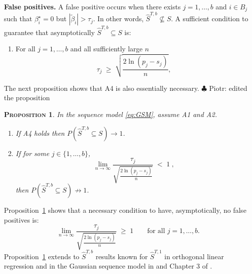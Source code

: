 \documentclass[aos]{imsart}
\theoremstyle{plain}
\newtheorem{prop}{\textsc{Proposition}}[section]
\newcommand{\piotr}[1]{{\small{\color{red} \sf $\clubsuit$ Piotr: #1}}}
\begin{document}
\noindent\textbf{False positives.} 
A false positive %
occurs when there exists $j=1,\ldots,b$ and $i\in B_j$ such that $\beta^\star_i=0$ %
but $|\tilde \beta_i|>\tau_j$. In other words, $\hat S^{T,b}\not\subseteq S$. A sufficient condition to guarantee that asymptotically $\hat S^{T,b}\subseteq S$ is:
\begin{enumerate}[start=4,label={(A\arabic*)}]
    \item For all $j=1,\ldots,b$ and all sufficiently large $n$
\begin{equation*}\label{cond:suffIallblockthresh} 
\tau_j \;\geq\;  \sqrt{\frac{{2\ln(p_j-s_j)}}{{n}}},	
\end{equation*}
\end{enumerate}
The next proposition shows that %
A4 is also essentially necessary.
\piotr{edited the proposition}
\begin{prop}\label{prop:suffnecIblockthresh}In the %
sequence model \eqref{eq:GSM}, assume A1 and A2.
\begin{enumerate}
    \item [a)] If A4 holds then %
$P(\hat{S}^{T,b}\subseteq S) \to 1$.
\item [b)] If for some $j\in\{1,\ldots,b\}$,
\begin{equation}\label{cond:necIallblockthresh0}
\lim_{n\to \infty} \frac{\tau_j}{\sqrt{\frac{{2\ln(p_j-s_j)}}{{n}}}} \;<\;1\; ,	\end{equation}
then  $P(\hat{S}^{T,b}\subseteq S ) \not \to 1$.
\end{enumerate}
\end{prop}
Proposition~\ref{prop:suffnecIblockthresh} shows that %
a necessary condition to have, asymptotically, no false positives %
is: 
\begin{equation}\label{cond:necIallblockthresh}
\lim_{n\to \infty} \frac{\tau_j}{\sqrt{\tfrac{2\ln(p_j-s_j)}{n}}}\;\geq\;1\qquad\mbox{for all }j=1,\ldots,b.	
\end{equation}
Proposition~\ref{prop:suffnecIblockthresh} extends to $\hat{S}^{T, b}$ results known for $\hat{S}^{T, 1}$ in orthogonal linear regression \cite{ slope, buhlmannvandegeerbook, wainwrighthighdimbook} and in the Gaussian sequence model in \cite{ariascastro} and Chapter 3 of \cite{johnstone}.
\bigskip
\end{document}
